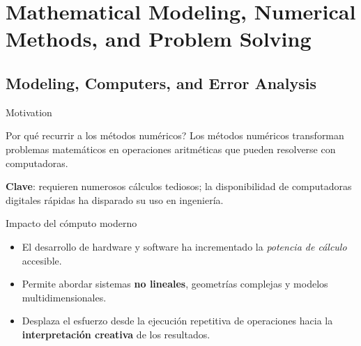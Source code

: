 \documentclass[main.tex]{subfiles}
\begin{document}
\section{Mathematical Modeling, Numerical Methods, and Problem Solving }

\subsection{Modeling, Computers, and Error Analysis}
\begin{frame}{Motivation}
\begin{block}{Por qué recurrir a los métodos numéricos?}
\vspace{0.2cm}
Los métodos numéricos transforman problemas matemáticos en operaciones aritméticas que pueden resolverse con computadoras.\par

\textbf{Clave}: requieren numerosos cálculos tediosos; la disponibilidad de computadoras digitales rápidas ha disparado su uso en ingeniería.
\end{block}

\begin{block}{Impacto del cómputo moderno}
\begin{itemize}
  \item El desarrollo de hardware y software ha incrementado la \emph{potencia de cálculo} accesible.
  \item Permite abordar sistemas \textbf{no lineales}, geometrías complejas y modelos multidimensionales.
  \item Desplaza el esfuerzo desde la ejecución repetitiva de operaciones hacia la \textbf{interpretación creativa} de los resultados.
\end{itemize}
\end{block}
\end{frame}
\end{document}
